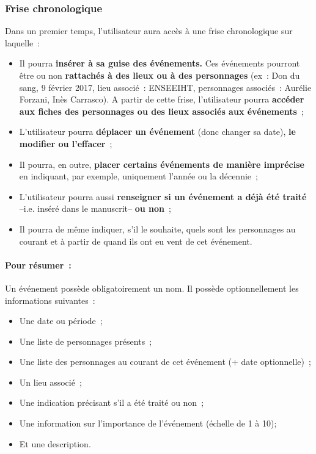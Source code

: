 \documentclass[a4paper,11pt,twoside]{article}
\begin{document}
\subsubsection{Frise chronologique}
Dans un premier temps, l'utilisateur aura accès à une frise chronologique sur laquelle~:
\begin{itemize}
	\item Il pourra \textbf{insérer à sa guise des événements.} Ces événements pourront être ou non \textbf{rattachés à des lieux ou à des personnages} (ex~: Don du sang, 9 février 2017, lieu associé~: ENSEEIHT, personnages associés~: Aurélie Forzani, Inès Carrasco). A partir de cette frise, l'utilisateur pourra \textbf{accéder aux fiches des personnages ou des lieux associés aux événements}~;
    \item L'utilisateur pourra \textbf{déplacer un événement} (donc changer sa date), \textbf{le modifier ou l'effacer}~;
    \item Il pourra, en outre, \textbf{placer certains événements de manière imprécise} en indiquant, par exemple, uniquement l'année ou la décennie~;
    \item L'utilisateur pourra aussi \textbf{renseigner si un événement a déjà été traité} --i.e. inséré dans le manuscrit-- \textbf{ou non}~;
    \item Il pourra de même indiquer, s'il le souhaite, quels sont les personnages au courant et à partir de quand ils ont eu vent de cet événement.
\end{itemize}

\paragraph{Pour résumer~:} Un événement possède obligatoirement un nom. Il possède optionnellement les informations suivantes~: 
\begin{itemize}
	\item Une date ou période~;
	\item Une liste de personnages présents~;
	\item Une liste des personnages au courant de cet événement (+ date optionnelle)~;
	\item Un lieu associé~;
	\item Une indication précisant s'il a été traité ou non~;
	\item Une information sur l'importance de l'événement (échelle de 1 à 10);
	\item Et une description.
\end{itemize}
\end{document}
